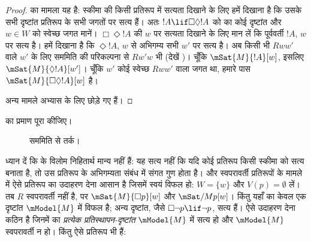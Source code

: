 \documentclass[../../../include/open-logic-section]{subfiles}
\begin{document}
\begin{proof}
   का मामला यह है: स्कीमा की किसी प्रतिरूप में सत्यता दिखाने के लिए
  हमें दिखाना है कि उसके सभी दृष्टांत प्रतिरूप के सभी जगतों पर सत्य हैं।
  अतः $!A \lif \Box\Diamond !A$ को  का कोई दृष्टांत और $w \in W$
  को स्वेच्छ जगत मानें। $\Box \Diamond !A$ की $w$ पर सत्यता दिखाने के लिए
  मान लें कि पूर्ववर्ती $!A$, $w$ पर सत्य है। हमें दिखाना है कि
  $\Diamond !A$, $w$ से अभिगम्य सभी $w'$ पर सत्य है। अब किसी भी $Rww'$ वाले
  $w'$ के लिए सममिति की परिकल्पना से $Rw'w$ भी (देखें
  )। चूँकि $\mSat{M}{!A}[w]$, इसलिए
  $\mSat{M}{\Diamond !A}[w']$। चूँकि $w'$ कोई स्वेच्छ $Rww'$ वाला जगत था,
  हमारे पास $\mSat{M}{\Box\Diamond!A}[w]$ है।

  अन्य मामले अभ्यास के लिए छोड़े गए हैं।
\end{proof}

\begin{prob}
   का प्रमाण पूरा कीजिए।
\end{prob}

\begin{figure}
  \begin{center}
  \end{center}
\caption{सममिति से तर्क।}
\end{figure}

ध्यान दें कि  के विलोम निहितार्थ मान्य नहीं हैं:
यह सत्य नहीं कि यदि कोई प्रतिरूप किसी स्कीमा को सत्य बनाता है, तो उस प्रतिरूप
के अभिगम्यता संबंध में संगत गुण होता है।  और स्वपरावर्ती प्रतिरूपों के
मामले में ऐसे प्रतिरूप का उदाहरण देना आसान है जिसमें स्वयं  विफल हो:
$W = \{w\}$ और $V(p) = \emptyset$ लें। तब $R$ स्वपरावर्ती नहीं है, पर
$\mSat{M}{\Box p}[w]$ और $\mSat/{M}{p}[w]$। किंतु यहाँ  का केवल एक
दृष्टांत $\mModel{M}$ में विफल है; अन्य दृष्टांत, जैसे
$\Box \lnot p \lif \lnot p$, सत्य हैं। ऐसे उदाहरण देना कठिन है जिनमें
 का \emph{प्रत्येक प्रतिस्थापन-दृष्टांत} $\mModel{M}$ में सत्य हो और
$\mModel{M}$ स्वपरावर्ती न हो। किंतु ऐसे प्रतिरूप भी हैं:
\end{document}
